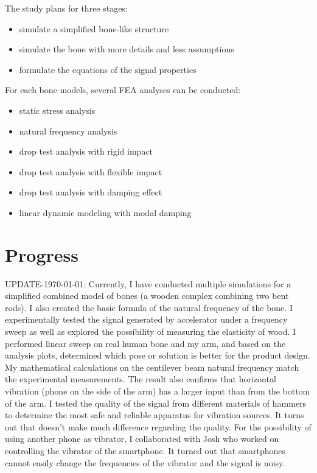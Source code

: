 \documentclass{sigchi}
\begin{document}
The study plans for three stages:
\begin{itemize}
\item simulate a simplified bone-like structure
\item simulate the bone with more details and less assumptions
\item formulate the equations of the signal properties
\newline
\end{itemize}

For each bone models, several FEA analyses can be conducted:
\begin{itemize}
\item static stress analysis
\item natural frequency analysis
\item drop test analysis with rigid impact
\item drop test analysis with flexible impact
\item drop test analysis with damping effect
\item linear dynamic modeling with modal damping 
\end{itemize}

\section{Progress} 

UPDATE-\today: Currently, I have conducted multiple simulations for a simplified combined model of bones (a wooden complex combining two bent rods). I also created the basic formula of the natural frequency of the bone. I experimentally tested the signal generated by accelerator under a frequency sweep as well as explored the possibility of measuring the elasticity of wood. I performed linear sweep on real human bone and my arm, and based on the analysis plots, determined which pose or solution is better for the product design. My mathematical calculations on the centilever beam natural frequency match the experimental measurements. The result also confirms that horizontal vibration (phone on the side of the arm) has a larger input than from the bottom of the arm. I tested the quality of the signal from different materials of hammers to determine the most safe and reliable apparatus for vibration sources. It turns out that doesn't make much difference regarding the quality. For the possibility of using another phone as vibrator, I collaborated with Josh who worked on controlling the vibrator of the smartphone. It turned out that smartphones cannot easily change the frequencies of the vibrator and the signal is noisy. 
\end{document}
